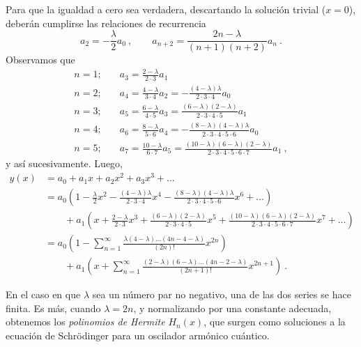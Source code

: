 \begin{ejemplo}
    Para que la igualdad a cero sea verdadera, descartando la solución trivial ($x=0$), deberán cumplirse las relaciones de recurrencia
    \begin{equation}
        a_2 = - \frac{\lambda}{2}a_0 \ , \qquad a_{n+2} = \frac{2n-\lambda}{(n+1)(n+2)}a_n \ .
    \end{equation}
    Observamos que
    \begin{align*}
        n=1; & \quad a_3 = \frac{2-\lambda}{2 \cdot 3} a_1 \\
        n=2; & \quad a_4 = \frac{4-\lambda}{3 \cdot 4} a_2 = - \frac{(4-\lambda) \lambda}{2 \cdot 3 \cdot 4} a_0 \\
        n=3; & \quad a_5 = \frac{6-\lambda}{4 \cdot 5} a_3 = \frac{(6-\lambda)(2-\lambda)}{2 \cdot 3 \cdot 4 \cdot 5} a_1 \\
        n=4; & \quad a_6 = \frac{8-\lambda}{5 \cdot 6}a_4 = - \frac{(8-\lambda)(4-\lambda)\lambda}{2 \cdot 3 \cdot 4 \cdot 5 \cdot 6} a_0 \\
        n=5; & \quad a_7 = \frac{10-\lambda}{6 \cdot 7} a_5 = \frac{(10-\lambda)(6-\lambda)(2-\lambda)}{2 \cdot 3 \cdot 4 \cdot 5 \cdot 6 \cdot 7} a_1 \ ,
    \end{align*}
    y así sucesivamente. Luego, 
    \begin{align}
        y(x) & = a_0 + a_1x + a_2 x^2 + a_3 x^3 + \dots \nonumber \\
        & = a_0 \left( 1 - \frac{\lambda}{2}x^2 - \frac{(4-\lambda)\lambda}{2 \cdot 3 \cdot 4}x^4 - \frac{(8-\lambda)(4-\lambda)\lambda}{2 \cdot 3 \cdot 4 \cdot 5 \cdot 6}x^6 + \dots \right) \nonumber \\
        & \qquad + a_1 \left( x + \frac{2-\lambda}{2 \cdot 3}x^3 + \frac{(6-\lambda)(2-\lambda)}{2 \cdot 3 \cdot 4 \cdot 5} x^5 + \frac{(10-\lambda)(6-\lambda)(2-\lambda)}{2 \cdot 3 \cdot 4 \cdot 5 \cdot 6 \cdot 7}x^7 + \dots \right) \nonumber \\
        & = a_0 \left( 1 - \sum_{n=1}^\infty \frac{\lambda(4-\lambda) \dots (4n - 4 - \lambda)}{(2n)!} x^{2n} \right) \nonumber \\
        & \qquad + a_1 \left( x + \sum_{n=1}^\infty \frac{(2-\lambda)(6-\lambda)\dots (4n-2-\lambda)}{(2n+1)!} x^{2n+1} \right) \ .
    \end{align}

    En el caso en que $\lambda$ sea un número par no negativo, una de las dos series se hace finita. Es más, cuando $\lambda = 2n$, y normalizando por una constante adecuada, obtenemos los \emph{polinomios de Hermite} $H_n(x)$, que surgen como soluciones a la ecuación de Schrödinger para un oscilador armónico cuántico.
\end{ejemplo}